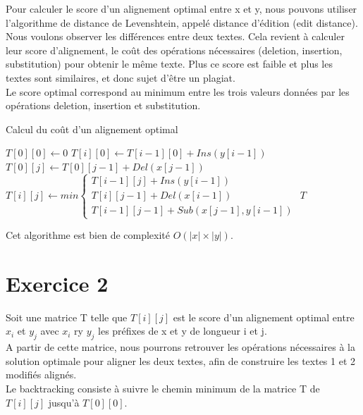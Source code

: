 \documentclass{article}
\begin{document}
Pour calculer le score d'un alignement optimal entre x et y, nous pouvons utiliser l'algorithme de distance de Levenshtein, appelé distance d'édition (edit distance).\\
Nous voulons observer les différences entre deux textes. Cela revient à calculer leur score d'alignement, le coût des opérations nécessaires (deletion, insertion, substitution) pour obtenir le même texte. Plus ce score est faible et plus les textes sont similaires, et donc sujet d'être un plagiat.\\
Le score optimal correspond au minimum entre les trois valeurs données par les opérations deletion, insertion et substitution. \\
\begin{algorithm}
\caption{Calcul du coût d'un alignement optimal}\label{algo:cout}
\begin{algorithmic}[1]
	\State $T[0][0] \gets 0 $
		\State $T[i][0] \gets T[i-1][0] + Ins(y[i-1])$
	\EndFor
		\State $T[0][j] \gets T[0][j-1] + Del(x[j-1])$
	\EndFor
			\State $T[i][j] \gets min\begin{cases}
							T[i-1][j] + Ins(y[i-1])\\
							T[i][j-1] + Del(x[i-1])\\
							T[i-1][j-1] + Sub(x[j-1],y[i-1])
							\end{cases}$
		\EndFor
	\EndFor
	\State \Return $T$	
\EndProcedure
\end{algorithmic}
\end{algorithm}
Cet algorithme est bien de complexité $O(\lvert x\rvert \times \lvert y\rvert)$.
 

\section{Exercice 2}

Soit une matrice T telle que $T[i][j]$ est le score d'un alignement optimal entre $x_{i}$ et $y_{j}$ avec $x_{i}$ ry $y_{j}$ les préfixes de x et y de longueur i et j.\\
A partir de cette matrice, nous pourrons retrouver les opérations nécessaires à la solution optimale pour aligner les deux textes, afin de construire les textes 1 et 2 modifiés alignés.\\
Le backtracking consiste à suivre le chemin minimum de la matrice T de
$T[i][j]$ jusqu'à $T[0][0]$.\\
\end{document}
